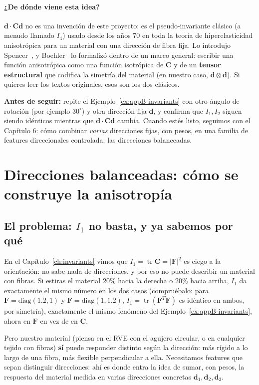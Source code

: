 \documentclass[11pt,a4paper]{article}
\newcommand{\tr}{\operatorname{tr}}
\begin{document}
\paragraph{¿De d\'onde viene esta idea?} $\bm d\cdot\bm C\bm d$ no es una
invenci\'on de este proyecto: es el pseudo-invariante cl\'asico (a menudo
llamado $I_4$) usado desde los a\~nos 70 en toda la teor\'ia de
hiperelasticidad anisotr\'opica para un material con una direcci\'on de
fibra fija. Lo introdujo Spencer~\cite{Spencer1971,Spencer1984}, y
Boehler~\cite{Boehler1987} lo formaliz\'o dentro de un marco general:
escribir una funci\'on anisotr\'opica como una funci\'on isotr\'opica de
$\bm C$ y de un \textbf{tensor estructural} que codifica la simetr\'ia
del material (en nuestro caso, $\bm d\otimes\bm d$). Si quieres leer los
textos originales, esos son los dos cl\'asicos.

\bigskip
\noindent\textbf{Antes de seguir:} repite el
Ejemplo~\ref{ex:appB-invariants} con otro \'angulo de rotaci\'on (por
ejemplo $30^\circ$) y otra direcci\'on fija $\bm d$, y confirma que
$I_1,I_2$ siguen siendo id\'enticos mientras que $\bm d\cdot\bm C\bm d$
cambia. Cuando est\'es listo, seguimos con el Cap\'itulo 6: c\'omo
combinar \emph{varias} direcciones fijas, con pesos, en una familia
de features direccionales controlada: las direcciones balanceadas.

\section{Direcciones balanceadas: c\'omo se construye la anisotrop\'ia}
\label{ch:balance}

\subsection{El problema: $I_1$ no basta, y ya sabemos por qu\'e}

En el Cap\'itulo~\ref{ch:invariants} vimos que $I_1=\tr\bm C=|\bm F|^2$
es ciego a la orientaci\'on: no sabe nada de direcciones, y por eso
no puede describir un material con fibras. Si estiras el material
$20\%$ hacia la derecha o $20\%$ hacia arriba, $I_1$ da
exactamente el mismo n\'umero en los dos casos (compru\'ebalo: para
$\bm F=\mathrm{diag}(1.2,1)$ y $\bm F=\mathrm{diag}(1,1.2)$,
$I_1=\tr(\bm F^T\bm F)$ es id\'entico en ambos, por simetr\'ia),
exactamente el mismo fen\'omeno del Ejemplo~\ref{ex:appB-invariants},
ahora en $\bm F$ en vez de en $\bm C$.

Pero nuestro material (piensa en el RVE con el agujero circular, o en
cualquier tejido con fibras) \textbf{s\'i} puede responder distinto
seg\'un la direcci\'on: m\'as r\'igido a lo largo de una fibra, m\'as
flexible perpendicular a ella. Necesitamos features que sepan
distinguir direcciones: ah\'i es donde entra la idea de sumar,
con pesos, la respuesta del material medida en varias direcciones
concretas $\bm d_1,\bm d_2,\bm d_3$.
\end{document}
